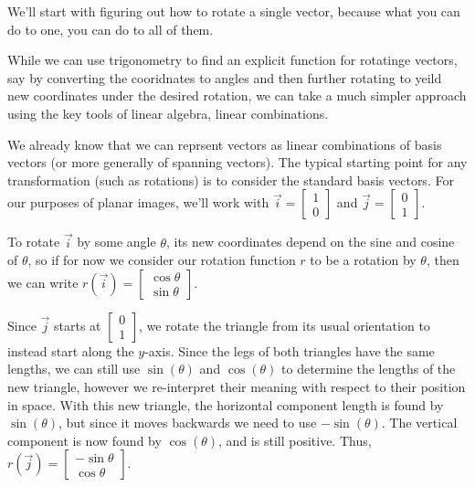 \documentclass{ximera}
\begin{document}
\begin{exploration}
        We'll start with figuring out how to rotate a single vector, because what you can do to one, you can do to all of them.

    \begin{example}

        While we can use trigonometry to find an explicit function for rotatinge vectors, say by converting the cooridnates to angles and then further rotating to yeild new coordinates under the desired rotation, we can take a much simpler approach using the key tools of linear algebra, linear combinations.

        We already know that we can reprsent vectors as linear combinations of basis vectors (or more generally of spanning vectors). The typical starting point for any transformation (such as rotations) is to consider the standard basis vectors. For our purposes of planar images, we'll work with $\vec{i} = \begin{bmatrix} 1 \\ 0 \end{bmatrix}$ and $\vec{j} = \begin{bmatrix} 0 \\ 1 \end{bmatrix}$.

        To rotate $\vec{i}$ by some angle $\theta$, its new coordinates depend on the sine and cosine of $\theta$, so if for now we consider our rotation function $r$ to be a rotation by $\theta$, then we can write $r(\vec{i}) = \begin{bmatrix} \cos\theta \\ \sin\theta \end{bmatrix}$.

        Since $\vec{j}$ starts at $\begin{bmatrix} 0 \\ 1 \end{bmatrix}$, we rotate the triangle from its usual orientation to instead start along the $y$-axis. Since the legs of both triangles have the same lengths, we can still use $\sin(\theta)$ and $\cos(\theta)$ to determine the lengths of the new triangle, however we re-interpret their meaning with respect to their position in space. With this new triangle, the horizontal component length is found by $\sin(\theta)$, but since it moves backwards we need to use $-\sin(\theta)$. The vertical component is now found by $\cos(\theta)$, and is still positive. Thus, $r(\vec{j}) = \begin{bmatrix} -\sin\theta \\ \cos\theta \end{bmatrix}$.


\end{example}
\end{exploration}
\end{document}
